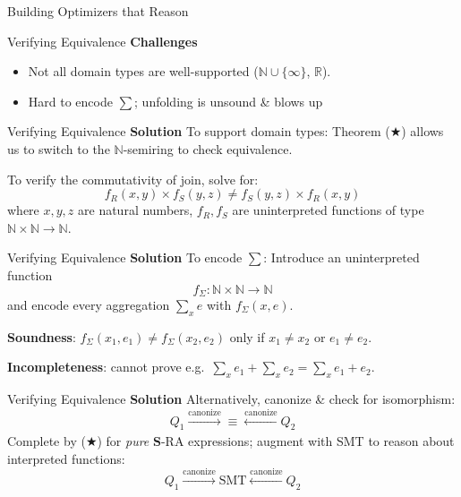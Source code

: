 \documentclass{beamer}
\newcommand{\N}{\mathbb N} %
\newcommand{\R}{\mathbb R} %
\newcommand{\SR}{\mathbf S} %
\newcommand{\set}[1]{\{#1\}}                    %
\begin{document}
  \begin{frame}{Building Optimizers that Reason}

  \end{frame}

  \begin{frame}{Verifying Equivalence}
    \textbf{Challenges}
    \begin{itemize}
      \item Not all domain types are well-supported ($\N \cup \set{\infty}$, $\R$).
      \item Hard to encode $\sum$; unfolding is unsound \& blows up
    \end{itemize}
  \end{frame}
  
  \begin{frame}{Verifying Equivalence}
    \textbf{Solution} To support domain types: Theorem ($\bigstar$) 
    allows us to switch to the $\N$-semiring to check equivalence. \pause
    
    To verify the commutativity of join, solve for: 
    \[f_R(x, y) \times f_S(y, z) \neq f_S(y, z) \times f_R(x, y)\]
    where $x, y, z$ are natural numbers, $f_R, f_S$ are uninterpreted
    functions of type $\N \times \N \rightarrow \N$. 
  \end{frame}

  \begin{frame}{Verifying Equivalence}
    \textbf{Solution} To encode $\sum$: Introduce an uninterpreted function
    \[f_{\Sigma}:\N\times \N \rightarrow \N\] 
    and encode every aggregation $\sum_x e$ with $f_{\Sigma}(x, e)$. \pause

    \textbf{Soundness}: $f_{\Sigma}(x_1, e_1) \neq f_{\Sigma}(x_2, e_2)$ only
    if $x_1 \neq x_2$ or $e_1 \neq e_2$.\pause

    \textbf{Incompleteness}: cannot prove 
    e.g.~$\sum_x e_1 + \sum_x e_2 = \sum_x e_1 + e_2$.
  \end{frame}

  \begin{frame}{Verifying Equivalence}
    \textbf{Solution} Alternatively, canonize \& check for isomorphism:
    \[Q_1 \xrightarrow[]{\text{canonize}} \equiv \xleftarrow[]{\text{canonize}} Q_2\]
    Complete by ($\bigstar$) for {\em pure} $\SR$-RA expressions; \pause
    augment with SMT to reason about interpreted functions:
    \[Q_1 \xrightarrow[]{\text{canonize}} \text{SMT} \xleftarrow[]{\text{canonize}} Q_2\]
  \end{frame}
\end{document}
